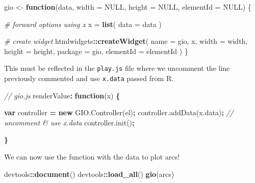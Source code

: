 \documentclass[
  10pt,
]{krantz}
\makeatletter
\newenvironment{Shaded}{\begin{snugshade}}{\end{snugshade}}
\newcommand{\AttributeTok}[1]{\textcolor[rgb]{0.61,0.61,0.61}{#1}}
\newcommand{\CommentTok}[1]{\textcolor[rgb]{0.37,0.37,0.37}{\textit{#1}}}
\newcommand{\ControlFlowTok}[1]{\textcolor[rgb]{0.27,0.27,0.27}{\textbf{#1}}}
\newcommand{\DataTypeTok}[1]{\textcolor[rgb]{0.27,0.27,0.27}{#1}}
\newcommand{\KeywordTok}[1]{\textcolor[rgb]{0.27,0.27,0.27}{\textbf{#1}}}
\newcommand{\NormalTok}[1]{#1}
\newcommand{\OperatorTok}[1]{\textcolor[rgb]{0.43,0.43,0.43}{\textbf{#1}}}
\newcommand{\OtherTok}[1]{\textcolor[rgb]{0.37,0.37,0.37}{#1}}
\newcommand{\StringTok}[1]{\textcolor[rgb]{0.5,0.5,0.5}{#1}}
\newcommand{\VariableTok}[1]{\textcolor[rgb]{0,0,0}{#1}}
\newenvironment{kframe}{%
\medskip{}
\setlength{\fboxsep}{.8em}
 \def\at@end@of@kframe{}%
 \ifinner\ifhmode%
  \def\at@end@of@kframe{\end{minipage}}%
  \begin{minipage}{\columnwidth}%
 \fi\fi%
 \def\FrameCommand##1{\hskip\@totalleftmargin \hskip-\fboxsep
 \colorbox{shadecolor}{##1}\hskip-\fboxsep
     \hskip-\linewidth \hskip-\@totalleftmargin \hskip\columnwidth}%
 \MakeFramed {\advance\hsize-\width
   \@totalleftmargin\z@ \linewidth\hsize
   \@setminipage}}%
 {\par\unskip\endMakeFramed%
 \at@end@of@kframe}
\renewenvironment{Shaded}{\begin{kframe}}{\end{kframe}}
\makeatother
\begin{document}
\begin{Shaded}
\begin{Highlighting}[]
\NormalTok{gio <{-}}\StringTok{ }\ControlFlowTok{function}\NormalTok{(data, }\DataTypeTok{width =} \OtherTok{NULL}\NormalTok{, }\DataTypeTok{height =} \OtherTok{NULL}\NormalTok{, }\DataTypeTok{elementId =} \OtherTok{NULL}\NormalTok{) \{}

  \CommentTok{\# forward options using x}
\NormalTok{  x =}\StringTok{ }\KeywordTok{list}\NormalTok{(}
    \DataTypeTok{data =}\NormalTok{ data}
\NormalTok{  )}

  \CommentTok{\# create widget}
\NormalTok{  htmlwidgets}\OperatorTok{::}\KeywordTok{createWidget}\NormalTok{(}
    \DataTypeTok{name =} \StringTok{\textquotesingle{}gio\textquotesingle{}}\NormalTok{,}
\NormalTok{    x,}
    \DataTypeTok{width =}\NormalTok{ width,}
    \DataTypeTok{height =}\NormalTok{ height,}
    \DataTypeTok{package =} \StringTok{\textquotesingle{}gio\textquotesingle{}}\NormalTok{,}
    \DataTypeTok{elementId =}\NormalTok{ elementId}
\NormalTok{  )}
\NormalTok{\}}
\end{Highlighting}
\end{Shaded}

This must be reflected in the \texttt{play.js} file where we uncomment the line previously commented and use \texttt{x.data} passed from R.

\begin{Shaded}
\begin{Highlighting}[]
\CommentTok{// gio.js}
\NormalTok{renderValue}\OperatorTok{:} \KeywordTok{function}\NormalTok{(x) }\OperatorTok{\{}

  \KeywordTok{var}\NormalTok{ controller }\OperatorTok{=} \KeywordTok{new} \VariableTok{GIO}\NormalTok{.}\AttributeTok{Controller}\NormalTok{(el)}\OperatorTok{;}
  \VariableTok{controller}\NormalTok{.}\AttributeTok{addData}\NormalTok{(}\VariableTok{x}\NormalTok{.}\AttributeTok{data}\NormalTok{)}\OperatorTok{;} \CommentTok{// uncomment \& use x.data}
  \VariableTok{controller}\NormalTok{.}\AttributeTok{init}\NormalTok{()}\OperatorTok{;}

\OperatorTok{\}}
\end{Highlighting}
\end{Shaded}

We can now use the function with the data to plot arcs!

\begin{Shaded}
\begin{Highlighting}[]
\NormalTok{devtools}\OperatorTok{::}\KeywordTok{document}\NormalTok{()}
\NormalTok{devtools}\OperatorTok{::}\KeywordTok{load\_all}\NormalTok{()}
\KeywordTok{gio}\NormalTok{(arcs)}
\end{Highlighting}
\end{Shaded}
\end{document}
